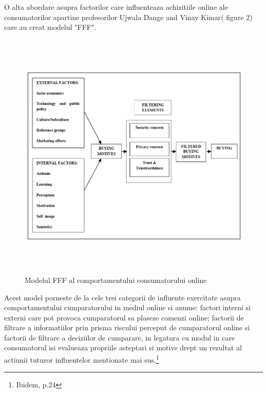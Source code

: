 \documentclass[a4paper, 12pt]{article}
\begin{document}
	\quad O alta abordare asupra factorilor care influenteaza achizitiile online ale consumatorilor apartine profesorilor Ujwala Dange and Vinay Kimar( figure 2) care au creat modelul "FFF".  
	\begin{figure}[!htb]
		\centering
		\includegraphics[width=15cm, height=12cm]{"figures/SECOND.png"}
		\caption{Modelul FFF al comportamentului consumatorului online}\label{fig:second}
	\end{figure}

	Acest model porneste de la cele trei categorii de influente exercitate asupra comportamentului cumparatorului in mediul online si anume: factori interni si externi care pot provoca cumparatorul sa plaseze comenzi online; factorii de filtrare a informatiilor prin prisma riscului perceput de cumparatorul online si factorii de filtrare a deciziilor de cumparare, in legatura cu modul in care consumatorul isi evalueaza propriile asteptari si motive drept un rezultat al actiunii tuturor influentelor mentionate mai sus.\footnote{Ibidem, p.24}
	
\end{document}
